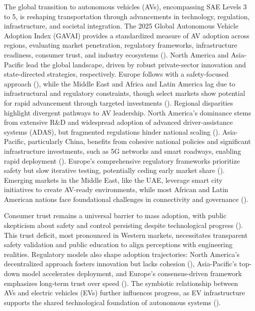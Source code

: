 The global transition to autonomous vehicles (AVs), encompassing SAE Levels 3 to 5, is reshaping transportation through advancements in technology, regulation, infrastructure, and societal integration. The 2025 Global Autonomous Vehicle Adoption Index (GAVAI) provides a standardized measure of AV adoption across regions, evaluating market penetration, regulatory frameworks, infrastructure readiness, consumer trust, and industry ecosystems (\cite{KPMG2018}). North America and Asia-Pacific lead the global landscape, driven by robust private-sector innovation and state-directed strategies, respectively. Europe follows with a safety-focused approach (\cite{GOVUK2025}), while the Middle East and Africa and Latin America lag due to infrastructural and regulatory constraints, though select markets show potential for rapid advancement through targeted investments (\cite{DubaiLaw2023}). Regional disparities highlight divergent pathways to AV leadership. North America's dominance stems from extensive R\&D and widespread adoption of advanced driver-assistance systems (ADAS), but fragmented regulations hinder national scaling (\cite{NCSL2025}). Asia-Pacific, particularly China, benefits from cohesive national policies and significant infrastructure investments, such as 5G networks and smart roadways, enabling rapid deployment (\cite{KPMG2018}). Europe’s comprehensive regulatory frameworks prioritize safety but slow iterative testing, potentially ceding early market share (\cite{GOVUK2025}). Emerging markets in the Middle East, like the UAE, leverage smart city initiatives to create AV-ready environments, while most African and Latin American nations face foundational challenges in connectivity and governance (\cite{DubaiLaw2023}).

Consumer trust remains a universal barrier to mass adoption, with public skepticism about safety and control persisting despite technological progress (\cite{PatentPC2025a,Deloitte2025}). This trust deficit, most pronounced in Western markets, necessitates transparent safety validation and public education to align perceptions with engineering realities. Regulatory models also shape adoption trajectories: North America’s decentralized approach fosters innovation but lacks cohesion (\cite{NCSL2025}), Asia-Pacific’s top-down model accelerates deployment, and Europe’s consensus-driven framework emphasizes long-term trust over speed (\cite{GOVUK2025}). The symbiotic relationship between AVs and electric vehicles (EVs) further influences progress, as EV infrastructure supports the shared technological foundation of autonomous systems (\cite{IEA2025}).

